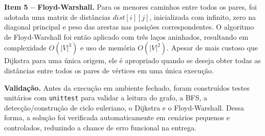 \documentclass[10pt,a4paper]{article}
\begin{document}
\textbf{Item 5 -- Floyd-Warshall.} Para os menores caminhos entre todos os pares, foi adotada uma matriz de distâncias \(dist[i][j]\), inicializada com infinito, zero na diagonal principal e peso das arestas nas posições correspondentes. O algoritmo de Floyd-Warshall foi então aplicado com três laços aninhados, resultando em complexidade \(O(|V|^3)\) e uso de memória \(O(|V|^2)\). Apesar de mais custoso que Dijkstra para uma única origem, ele é apropriado quando se deseja obter todas as distâncias entre todos os pares de vértices em uma única execução.

\textbf{Validação.} Antes da execução em ambiente fechado, foram construídos testes unitários com \texttt{unittest} para validar a leitura do grafo, a BFS, a detecção/construção de ciclo euleriano, o Dijkstra e o Floyd-Warshall. Dessa forma, a solução foi verificada automaticamente em cenários pequenos e controlados, reduzindo a chance de erro funcional na entrega.
\end{document}
